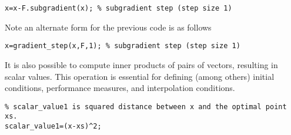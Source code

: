 \documentclass[11pt,a4paper]{article}
\begin{document}
\begin{enumerate}
\begin{itemize}
\begin{lstlisting}
x=x-F.subgradient(x); % subgradient step (step size 1)
\end{lstlisting}
Note an alternate form for the previous code is as follows\\[-1cm]
\begin{lstlisting}
x=gradient_step(x,F,1); % subgradient step (step size 1)
\end{lstlisting}
\end{itemize}
It is also possible to compute inner products of pairs of vectors, resulting in scalar values. This operation is essential for defining (among others) initial conditions, performance measures, and interpolation conditions.\\[-1cm]
\begin{lstlisting}
% scalar_value1 is squared distance between x and the optimal point xs.
scalar_value1=(x-xs)^2; 


\end{lstlisting}
\end{enumerate}
\end{document}
